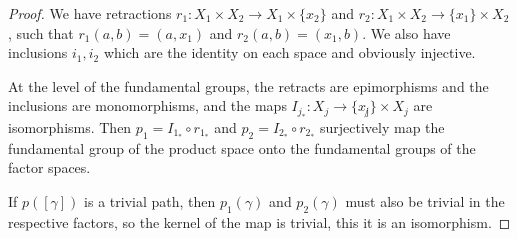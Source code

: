 \begin{proof}
	We have retractions $r_1:X_1\times X_2\rightarrow X_1\times \{x_2\}$ and $r_2:X_1\times X_2\rightarrow \{x_1\}\times X_2$, such that $r_1(a,b)=(a,x_1)$ and $r_2(a,b)=(x_1,b)$.  We also have inclusions $i_1,i_2$ which are the identity on each space and obviously injective.
	
	At the level of the fundamental groups, the retracts are epimorphisms and the inclusions are monomorphisms, and the maps $I_{j_\ast}:X_j\rightarrow \{x_\not j\}\times X_j$ are isomorphisms.  Then $p_1=I_{1_\ast}\circ r_{1_\ast}$ and $p_2=I_{2_\ast}\circ r_{2_\ast}$ surjectively map the fundamental group of the product space onto the fundamental groups of the factor spaces.
	
	If $p([\gamma])$ is a trivial path, then $p_1(\gamma)$ and $p_2(\gamma)$ must also be trivial in the respective factors, so the kernel of the map is trivial, this it is an isomorphism.
\end{proof}